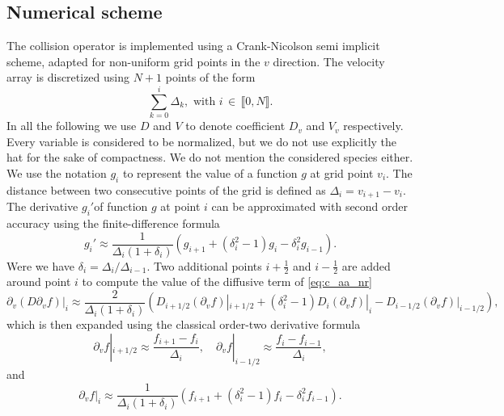 \documentclass[11pt]{article}
\begin{document}
\subsection{Numerical scheme}
\label{sub:numerical_scheme}
The collision operator is implemented using a Crank-Nicolson semi implicit scheme, adapted for non-uniform grid points in the $v$ direction. The velocity array is discretized using $N +1$ points of the form  
%
\begin{equation}  
\sum\limits_{k=0}^{i} \Delta_k, \,\, \text{with} \, \, i \, \in \, \llbracket 0, N \rrbracket. 
\end{equation}
%
In all the following we use $D$ and $V$ to denote coefficient $D_v$ and $V_v$ respectively. Every variable is considered to be normalized, but we do not use explicitly the hat for the sake of compactness. We do not mention the considered species either. We use the notation $g_i$ to represent the value of a function $g$ at grid point $v_i$. The distance between two consecutive points of the grid is defined as $\Delta_i = v_{i+1}-v_i$. The derivative $g_i'$of function $g$ at point $i$ can be approximated with second order accuracy using the finite-difference formula
%
\begin{equation}\label{eq:diff_fmla}
  g_i' \approx \dfrac{1}{\Delta_i( 1 + \delta_i ) }\left( g_{i+1} + ( \delta_i^2 -1)g_i  - \delta_i^2 g_{i-1}\right).
\end{equation}
%
Were we have $\delta_i = \Delta_i / \Delta_{i-1}$. Two additional points $i+\tfrac{1}{2}$ and $i-\tfrac{1}{2}$ are added around point $i$ to compute the value of the diffusive term of \cref{eq:c_aa_nr}
%
\begin{equation}\label{eq:diff_tem}
  \partial_{v} (D \partial_{v}f )|_i \approx \dfrac{2}{\Delta_i(1+\delta_i)}\left( D_{i+1/2}  \left( \partial_{v}f \right)|_{i+1/2}  + ( \delta_i^2-1)D_i \left( \partial_{v} f \right) |_i  - D_{i-1/2}  \left( \partial_{v}f \right)|_{i-1/2}\right), 
\end{equation}
%
which is then expanded using the classical order-two derivative formula
%
\begin{equation}
  \partial_{v}f|_{i+1/2} \approx \dfrac{f_{i+1} - f_{i}}{\Delta_i}, \quad  \partial_{v}f|_{i-1/2} \approx \dfrac{f_{i} - f_{i-1}}{\Delta_i},
\end{equation}
%
and
%
\begin{equation}
 \partial_{v}f|_i \approx \dfrac{1}{\Delta_i(1+\delta_i)} \left( f_{i+1} + (\delta_i^2-1)f_i - \delta_i^2f_{i-1} \right).
\end{equation}
\end{document}
